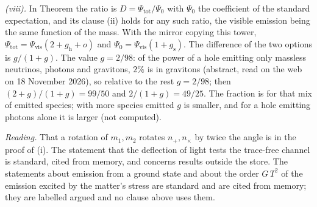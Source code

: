 \emph{(viii).} In Theorem  the ratio is $D = \Psi_{\mathrm{tot}}/\Psi_{0}$ with $\Psi_{0}$ the coefficient of the standard expectation, and its clause (ii) holds for any such ratio, the visible emission being the same function of the mass. With the mirror copying this tower, $\Psi_{\mathrm{tot}} = \Psi_{\mathrm{vis}}(2 + g_{\mathrm{h}} + o)$ and $\Psi_{0} = \Psi_{\mathrm{vis}}(1 + g_{\mathrm{s}})$. The difference of the two options is $g/(1 + g)$. The value $g = 2/98$: of the power of a hole emitting only massless neutrinos, photons and gravitons, $2\%$ is in gravitons \cite{Page1976} (abstract, read on the web on 18 November 2026), so relative to the rest $g = 2/98$; then $(2 + g)/(1 + g) = 99/50$ and $2/(1 + g) = 49/25$. The fraction is for that mix of emitted species; with more species emitted $g$ is smaller, and for a hole emitting photons alone it is larger (not computed).

\emph{Reading.} That a rotation of $m_{1}, m_{2}$ rotates $n_{+}, n_{\times}$ by twice the angle is in the proof of (i). The statement that the deflection of light tests the trace-free channel is standard, cited from memory, and concerns results outside the store. The statements about emission from a ground state and about the order $G\,T^{2}$ of the emission excited by the matter's stress are standard and are cited from memory; they are labelled argued and no clause above uses them.
